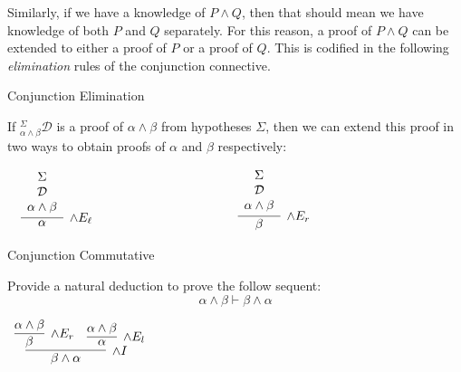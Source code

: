 \documentclass{book}
\begin{document}
    Similarly, if we have a knowledge of $P \land Q$, then that should mean we have knowledge of both $P$ and $Q$ separately. For this reason, a proof of $P \land Q$ can be extended to either a proof of $P$ or a proof of $Q$. This is codified in the following \emph{elimination} rules of the conjunction connective. 

    {Conjunction Elimination}

        If $^{\Sigma}_{\alpha \land \beta}\mathcal{D}$ is a proof of $\alpha \land \beta$ from hypotheses $\Sigma$, then we can extend this proof in two ways to obtain proofs of $\alpha$ and $\beta$ respectively: 

        \begin{center}
            $\begin{array} { c c c }
            
            \begin{array}{ c  c  c }			
                 \infer[\land E_{\ell}]{\alpha}
                    {\begin{array}{c}
                        \Sigma \\
                        \mathcal{D} \\
                        \alpha \land \beta
                    \end{array}}
            \end{array}
    
            & \hspace{3cm} &
    
            \begin{array}{ c  c  c }			
                \infer[\land E_{r}]{\beta}
                {\begin{array}{c}
                    \Sigma \\
                    \mathcal{D} \\
                    \alpha \land \beta
                \end{array}}	
            \end{array}\\		
    
            \end{array}$
        \end{center}	
    

    \begin{eg}{Conjunction Commutative}

        Provide a natural deduction to prove the follow sequent: $$ \alpha \land \beta \vdash \beta \land \alpha $$

        \begin{center}
            $\begin{array}{c}
                \infer[\land I]{\beta \land \alpha}
                    {\infer[\land E_{r}]{\beta}
                        {\alpha \land \beta}
                    &
                    \infer[\land E_{l}]{\alpha}
                        {\alpha \land \beta}}
            \end{array}$
        \end{center}
        
    \end{eg}
\end{document}

